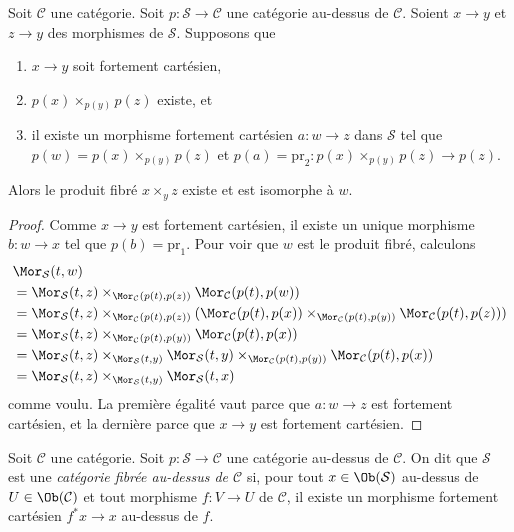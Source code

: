 \begin{lemma}
\label{lemma-strongly-cartesian-fibre-product}
Soit $\mathcal{C}$ une catégorie.
Soit $p : \mathcal{S} \to \mathcal{C}$ une catégorie au-dessus de
$\mathcal{C}$. Soient $x \to y$ et $z \to y$ des morphismes de
$\mathcal{S}$. Supposons que
\begin{enumerate}
\item $x \to y$ soit fortement cartésien,
\item $p(x) \times_{p(y)} p(z)$ existe, et
\item il existe un morphisme fortement cartésien $a : w \to z$ dans
$\mathcal{S}$ tel que $p(w) = p(x) \times_{p(y)} p(z)$ et
$p(a) = \text{pr}_2 : p(x) \times_{p(y)} p(z) \to p(z)$.
\end{enumerate}
Alors le produit fibré $x \times_y z$ existe et est isomorphe à $w$.
\end{lemma}

\begin{proof}
Comme $x \to y$ est fortement cartésien, il existe un unique morphisme
$b : w \to x$ tel que $p(b) = \text{pr}_1$. Pour voir que $w$ est le
produit fibré, calculons
\begin{align*}
& \Mor_\mathcal{S}(t, w) \\
& = \Mor_\mathcal{S}(t, z)
\times_{\Mor_\mathcal{C}(p(t), p(z))}
\Mor_\mathcal{C}(p(t), p(w)) \\
& = \Mor_\mathcal{S}(t, z)
\times_{\Mor_\mathcal{C}(p(t), p(z))}
(\Mor_\mathcal{C}(p(t), p(x))
\times_{\Mor_\mathcal{C}(p(t), p(y))}
\Mor_\mathcal{C}(p(t), p(z))) \\
& = \Mor_\mathcal{S}(t, z)
\times_{\Mor_\mathcal{C}(p(t), p(y))}
\Mor_\mathcal{C}(p(t), p(x)) \\
& = \Mor_\mathcal{S}(t, z)
\times_{\Mor_\mathcal{S}(t, y)}
\Mor_\mathcal{S}(t, y)
\times_{\Mor_\mathcal{C}(p(t), p(y))}
\Mor_\mathcal{C}(p(t), p(x)) \\
& = \Mor_\mathcal{S}(t, z)
\times_{\Mor_\mathcal{S}(t, y)}
\Mor_\mathcal{S}(t, x)
\end{align*}
comme voulu. La première égalité vaut parce que $a : w \to z$ est
fortement cartésien, et la dernière parce que $x \to y$ est fortement
cartésien.
\end{proof}

\begin{definition}
\label{definition-fibred-category}
Soit $\mathcal{C}$ une catégorie.
Soit $p : \mathcal{S} \to \mathcal{C}$ une catégorie au-dessus de
$\mathcal{C}$. On dit que $\mathcal{S}$ est une
{\it catégorie fibrée au-dessus de $\mathcal{C}$} si, pour tout
$x \in \Ob(\mathcal{S})$ au-dessus de
$U \in \Ob(\mathcal{C})$ et tout morphisme $f : V \to U$ de
$\mathcal{C}$, il existe un morphisme fortement cartésien
$f^*x \to x$ au-dessus de $f$.
\end{definition}

